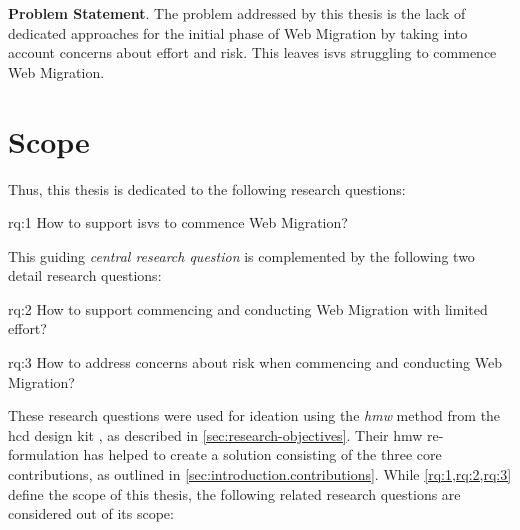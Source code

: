 \textbf{Problem Statement}. The problem addressed by this thesis is the lack of dedicated approaches for the initial phase of \gls{Web Migration} by taking into account concerns about effort and risk. This leaves \glspl{isv} struggling to commence \gls{Web Migration}.

\hypertarget{sec:scope}{%
\section{Scope}\label{sec:scope}}

Thus, this thesis is dedicated to the following research questions:

\begin{researchquestion}{rq:1}
How to support \glspl{isv} to commence \gls{Web Migration}?
\end{researchquestion}

This guiding \emph{central research question} \autocite{Creswell2014ResearchDesign} is complemented by the following two detail research questions: 

\begin{researchquestion}{rq:2}
How to support commencing and conducting \gls{Web Migration} with limited effort?
\end{researchquestion}
\begin{researchquestion}{rq:3}
How to address concerns about risk when commencing and conducting \gls{Web Migration}?
\end{researchquestion}

These research questions were used for ideation using the \emph{\gls{hmw}} method from the \gls{hcd} design kit \autocite{HCD2015}, as described in \cref{sec:research-objectives}.
Their \gls{hmw} re-formulation has helped to create a solution consisting of the three core contributions, as outlined in \cref{sec:introduction.contributions}.
While \cref{rq:1,rq:2,rq:3} define the scope of this thesis, the following related research questions are considered out of its scope:

